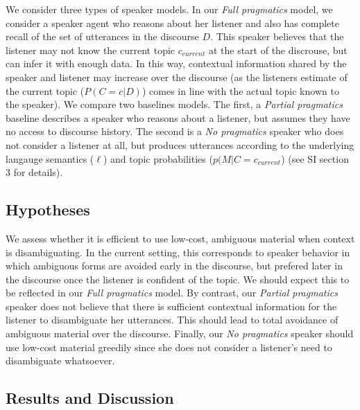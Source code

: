\documentclass[10pt, letterpaper]{article}
\begin{document}
We consider three types of speaker models. In our
\textit{Full pragmatics} model, we consider a speaker agent who reasons
about her listener and also has complete recall of the set of utterances
in the discourse \(D\). This speaker believes that the listener may not
know the current topic \(c_{current}\) at the start of the discrouse,
but can infer it with enough data. In this way, contextual information
shared by the speaker and listener may increase over the discourse (as
the listeners estimate of the current topic (\(P(C=c|D)\)) comes in line
with the actual topic known to the speaker). We compare two baselines
models. The first, a \textit{Partial pragmatics} baseline describes a
speaker who reasons about a listener, but assumes they have no access to
discourse history. The second is a \textit{No pragmatics} speaker who
does not consider a listener at all, but produces utterances according
to the underlying langauge semantics (\(\ell\)) and topic probabilities
(\(p(M|C=c_{current}\)) (see SI section 3 for details).\par

\subsection{Hypotheses}\label{hypotheses}

We assess whether it is efficient to use low-cost, ambiguous material
when context is disambiguating. In the current setting, this corresponds
to speaker behavior in which ambiguous forms are avoided early in the
discourse, but prefered later in the discourse once the listener is
confident of the topic. We should expect this to be reflected in our
\textit{Full pragmatics} model. By contrast, our
\textit{Partial pragmatics} speaker does not believe that there is
sufficient contextual information for the listener to disambiguate her
utterances. This should lead to total avoidance of ambiguous material
over the discourse. Finally, our \textit{No pragmatics} speaker should
use low-cost material greedily since she does not consider a listener's
need to disambiguate whatsoever.\par

\subsection{Results and Discussion}\label{results-and-discussion-1}
\end{document}
